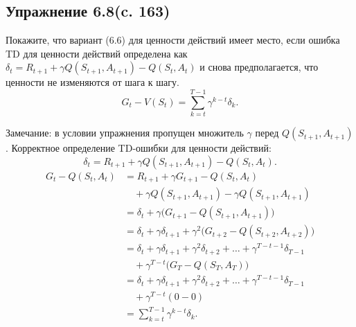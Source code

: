 \subsection{Упражнение 6.8(c. 163)}
Покажите, что вариант (6.6) для ценности действий имеет место, если ошибка TD для ценности действий определена как $\delta_t = R_{t+1} + \gamma Q(S_{t+1}, A_{t+1}) - Q(S_t, A_t)$ и снова предполагается, что ценности не изменяются от шага к шагу.
\begin{equation}
    G_t - V(S_t) = \sum_{k=t}^{T-1} \gamma^{k-t} \delta_k.
    \tag{6.6}
\end{equation}
\begin{solution}
    Замечание: в условии упражнения пропущен множитель $\gamma$ перед $Q(S_{t+1}, A_{t+1})$. Корректное определение TD-ошибки для ценности действий:
    \[
    \delta_t = R_{t+1} + \gamma Q(S_{t+1}, A_{t+1}) - Q(S_t, A_t).
    \]
    \begin{align*}
        G_t - Q(S_t, A_t)
        &= R_{t+1} + \gamma G_{t+1} - Q(S_t, A_t) \\
        &\quad + \gamma Q(S_{t+1}, A_{t+1}) - \gamma Q(S_{t+1}, A_{t+1}) \\
        &= \delta_t + \gamma\bigl(G_{t+1} - Q(S_{t+1}, A_{t+1})\bigr) \\
        &= \delta_t + \gamma \delta_{t+1}
        + \gamma^2 \bigl(G_{t+2} - Q(S_{t+2}, A_{t+2})\bigr) \\
        &= \delta_t + \gamma \delta_{t+1} + \gamma^2 \delta_{t+2} + \dots
        + \gamma^{T-t-1} \delta_{T-1} \\
        &\quad + \gamma^{T-t}\bigl(G_T - Q(S_T, A_T)\bigr) \\
        &= \delta_t + \gamma \delta_{t+1} + \gamma^2 \delta_{t+2} + \dots
        + \gamma^{T-t-1} \delta_{T-1} \\
        &\quad + \gamma^{T-t}(0 - 0) \\
        &= \sum_{k=t}^{T-1} \gamma^{k-t} \delta_k.
    \end{align*}
\end{solution}

